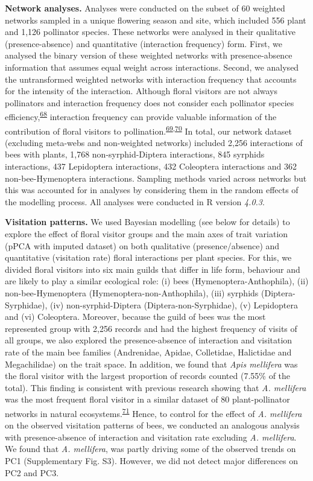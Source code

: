 \documentclass[
  12pt,
  a4paper,
]{article}
\begin{document}
\textbf{Network analyses.} Analyses were conducted on the subset of 60 weighted networks sampled in a unique flowering season and site, which included 556 plant and 1,126 pollinator species. These networks were analysed in their qualitative (presence-absence) and quantitative (interaction frequency) form. First, we analysed the binary version of these weighted networks with presence-absence information that assumes equal weight across interactions. Second, we analysed the untransformed weighted networks with interaction frequency that accounts for the intensity of the interaction. Although floral visitors are not always pollinators and interaction frequency does not consider each pollinator species efficiency,\textsuperscript{\protect\hyperlink{ref-ballantyne2015}{68}} interaction frequency can provide valuable information of the contribution of floral visitors to pollination.\textsuperscript{\protect\hyperlink{ref-vazquez2005}{69},\protect\hyperlink{ref-vazquez2012}{70}} In total, our network dataset (excluding meta-webs and non-weighted networks) included 2,256 interactions of bees with plants, 1,768 non-syrphid-Diptera interactions, 845 syrphids interactions, 437 Lepidoptera interactions, 432 Coleoptera interactions and 362 non-bee-Hymenoptera interactions. Sampling methods varied across networks but this was accounted for in analyses by considering them in the random effects of the modelling process. All analyses were conducted in R version \emph{4.0.3}.

\textbf{Visitation patterns.} We used Bayesian modelling (see below for details) to explore the effect of floral visitor groups and the main axes of trait variation (pPCA with imputed dataset) on both qualitative (presence/absence) and quantitative (visitation rate) floral interactions per plant species. For this, we divided floral visitors into six main guilds that differ in life form, behaviour and are likely to play a similar ecological role: (i) bees (Hymenoptera-Anthophila), (ii) non-bee-Hymenoptera (Hymenoptera-non-Anthophila), (iii) syrphids (Diptera-Syrphidae), (iv) non-syrphid-Diptera (Diptera-non-Syrphidae), (v) Lepidoptera and (vi) Coleoptera. Moreover, because the guild of bees was the most represented group with 2,256 records and had the highest frequency of visits of all groups, we also explored the presence-absence of interaction and visitation rate of the main bee families (Andrenidae, Apidae, Colletidae, Halictidae and Megachilidae) on the trait space. In addition, we found that \emph{Apis mellifera} was the floral visitor with the largest proportion of records counted (7.55\% of the total). This finding is consistent with previous research showing that \emph{A. mellifera} was the most frequent floral visitor in a similar dataset of 80 plant-pollinator networks in natural ecosystems.\textsuperscript{\protect\hyperlink{ref-hung2018}{71}} Hence, to control for the effect of \emph{A. mellifera} on the observed visitation patterns of bees, we conducted an analogous analysis with presence-absence of interaction and visitation rate excluding \emph{A. mellifera}. We found that \emph{A. mellifera}, was partly driving some of the observed trends on PC1 (Supplementary Fig. S3). However, we did not detect major differences on PC2 and PC3.
\end{document}
